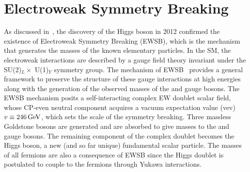 \section{Electroweak Symmetry Breaking}
\label{sec:sm_math}
As discussed in~\cite{particle_data_group_review_2020}, the discovery of the Higgs boson in 2012 confirmed the existence of Electroweak Symmetry Breaking (EWSB), which is the mechanism that generates the masses of the known elementary particles.
In the SM, the electroweak interactions are described by a gauge field theory invariant under the SU(2)$_L\times$ U(1)$_Y$ symmetry group.
The mechanism of EWSB~\cite{PhysRevLett.13.321,PhysRev.145.1156} provides a general framework to preserve the structure of these gauge interactions at high energies along with the generation of the observed masses of the \PW and \PZ gauge bosons.
The EWSB mechanism posits a self-interacting complex EW doublet scalar field, whose CP-even neutral component acquires a vacuum expectation value (vev) $v \equiv 246\,\text{Ge\hspace{-.08em}V}$, which sets the scale of the symmetry breaking.
Three massless Goldstone bosons are generated and are absorbed to give masses to the \PW and \PZ gauge bosons.
The remaining component of the complex doublet becomes the Higgs boson, a new (and so far unique) fundamental scalar particle.
The masses of all fermions are also a consequence of EWSB since the Higgs doublet is postulated to couple to the fermions through Yukawa interactions.


